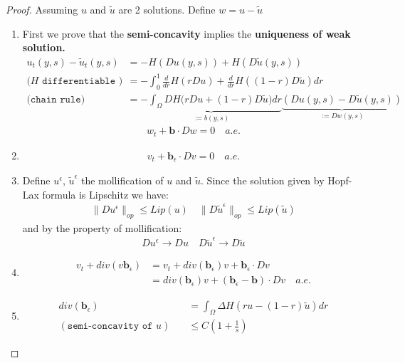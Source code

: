 \documentclass[a4paper,11pt,oneside,fleqn]{book}
\theoremstyle{definition}
\theoremstyle{remark}
\begin{document}
\begin{proof}\quad
Assuming $u$ and $\tilde{u}$ are 2 solutions. Define $w = u - \tilde{u}$
\begin{enumerate}
	\item First we prove that the \textbf{semi-concavity} implies the \textbf{uniqueness of weak solution.}
	\begin{align*}
	u_t(y, s) - \tilde{u}_t(y, s) 
		&= -H(Du(y, s)) + H(D\tilde{u}(y, s))\\
		\texttt{($H$ differentiable ) }
		&= -\int_0^1 \frac{d}{dr} H(rDu) +  \frac{d}{dr}H( (1-r)D\tilde{u})dr  \\
		\texttt{(chain rule) }
		&= \underbrace{ -\int_\Omega DH\bigg( rDu + (1 - r) D\tilde{u}\bigg)dr}_{:= b(y, s)} \underbrace{ (Du(y, s) - D\tilde{u}(y, s))}_{:= Dw(y, s)}
	\end{align*}
	\begin{align*}
		w_t + \textbf{b} \cdot Dw = 0 \quad a.e.
	\end{align*}
	\item
	\begin{align*}
		v_t + \textbf{b}_\epsilon \cdot Dv = 0 \quad a.e.
	\end{align*}
	\item Define $u^\epsilon$, $\tilde{u}^\epsilon$ the mollification of $u$ and $\tilde{u}$. Since the solution given by Hopf-Lax formula is Lipschitz we have:
	\begin{align*}
		\|D u^\epsilon\|_{op} \le Lip(u) \quad \|D\tilde{u}^\epsilon\|_{op} \le Lip(\tilde{u})
	\end{align*}
	and by the property of mollification:
	\begin{align*}
		Du^\epsilon \rightarrow Du \quad D\tilde{u}^\epsilon \rightarrow D \tilde{u}
	\end{align*}
	\item
	\begin{align*}
		v_t + div(v \textbf{b}_\epsilon) &= v_t + div(\textbf{b}_\epsilon)v + \textbf{b}_\epsilon \cdot D v \\
		&= div(\textbf{b}_\epsilon) v + (\textbf{b}_\epsilon - \textbf{b}) \cdot Dv \quad a.e.
	\end{align*}
	\item 
	\begin{align*}
		div(\textbf{b}_\epsilon)&= 
		\int_\Omega \Delta H(ru - (1 - r) \tilde{u}) dr \\
		(\texttt{semi-concavity of } u)\quad
		&\le C(1 + \frac{1}{s})
	\end{align*}

\end{enumerate}
\end{proof}
\end{document}
